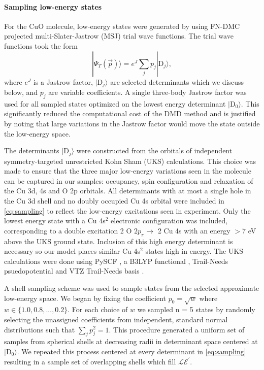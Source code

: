 \documentclass[12pt]{article}
\begin{document}
\paragraph{Sampling low-energy states}
For the CuO molecule, low-energy states were generated by using FN-DMC projected multi-Slater-Jastrow (MSJ) trial wave functions.
The trial wave functions took the form
\begin{equation}
|\Psi_T(\vec{p}) \rangle =  e^{J}\sum_{j} p_j|\text{D}_j\rangle,
\label{eq:sampling}
\end{equation}
where $e^J$ is a Jastrow factor, $|\text{D}_j\rangle$ are selected determinants which we discuss below, and $p_j$ are variable coefficients.
A single three-body Jastrow factor was used for all sampled states optimized on the lowest energy determinant $|\text{D}_0 \rangle$.
This significantly reduced the computational cost of the DMD method and is justified by noting that large variations in the Jastrow factor would move the state outside the low-energy space.

The determinants $|\text{D}_j \rangle$ were constructed from the orbitals of independent symmetry-targeted unrestricted Kohn Sham (UKS) calculations.
This choice was made to ensure that the three major low-energy variations seen in the molecule can be captured in our samples: occupancy, spin configuration and relaxation of the Cu 3d, 4s and O 2p orbitals.
All determinants with at most a single hole in the Cu 3d shell and no doubly occupied Cu 4s orbital were included in \eqref{eq:sampling} to reflect the low-energy excitations seen in experiment.
Only the lowest energy state with a Cu 4s$^2$ electronic configuration was included, corresponding to a double excitation 2 O ${2p_\pi} \rightarrow$ 2 Cu 4s with an energy $>7$ eV above the UKS ground state.
Inclusion of this high energy determinant is necessary so our model places similar Cu 4s$^2$ states high in energy.
The UKS calculations were done using PySCF \cite{Sun2018}, a B3LYP functional \cite{doi:10.1063/1.464304, PhysRevB.37.785}, Trail-Needs psuedopotential and VTZ Trail-Needs basis \cite{doi:10.1063/1.4811651}.

A shell sampling scheme was used to sample states from the selected approximate low-energy space.
We began by fixing the coefficient $p_0 = \sqrt{w}$ where $w \in \{1.0, 0.8, ..., 0.2\}$. 
For each choice of $w$ we sampled n = 5 states by randomly selecting the unassigned coefficients from independent, standard normal distributions such that $\sum_j p_j^2 = 1$. 
This procedure generated a uniform set of samples from spherical shells at decreasing radii in determinant space centered at $|\text{D}_0\rangle$.
We repeated this process centered at every determinant in \eqref{eq:sampling} resulting in a sample set of overlapping shells which fill $\mathcal{LE}^\prime$.
\end{document}
